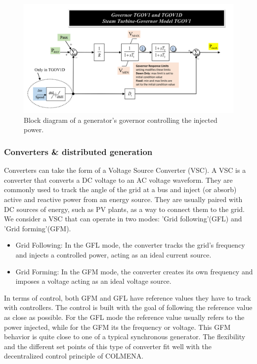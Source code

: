 \documentclass{article}
\begin{document}
\begin{figure}[!htb]
    \centering
    \includegraphics[width=1\textwidth]{pictures/governor.png}
    \caption{Block diagram of a generator's governor controlling the injected power. \cite{image:diagram:governor}}
    \label{pic:governor_diagram}
\end{figure} 

\subsubsection*{Converters \& distributed generation}

Converters can take the form of a Voltage Source Converter (VSC). A VSC is a converter that converts a DC voltage to an AC voltage waveform.  They are commonly used to track the angle of the grid at a bus and inject (or absorb) active and reactive power from an energy source. They are usually paired with DC sources of energy, such as PV plants, as a way to connect them to the grid. We consider a VSC that can operate in two modes: 'Grid following'(GFL) and 'Grid forming'(GFM). 

\begin{itemize}
    \item Grid Following: In the GFL mode, the converter tracks the grid's frequency and injects a controlled power, acting as an ideal current source.
    \item Grid Forming: In the GFM mode, the converter creates its own frequency and imposes a voltage acting as an ideal voltage source.
\end{itemize}

In terms of control, both GFM and GFL have reference values they have to track with controllers. The control is built with the goal of following the reference value as close as possible. For the GFL mode the reference value usually refers to the power injected, while for the GFM its the frequency or voltage. This GFM behavior is quite close to one of a typical synchronous generator. The flexibility and the different set points of this type of converter fit well with the decentralized control principle of COLMENA.
\end{document}
